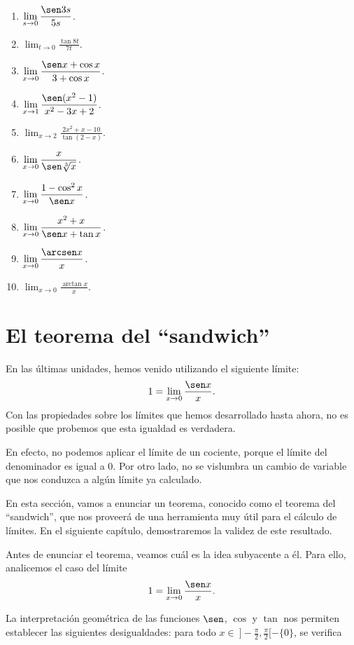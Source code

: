 \begin{multicols}{2}
\begin{enumerate}[leftmargin=*]
\begin{enumerate}[leftmargin=*]
\item $\displaystyle \lim_{s\to 0}\frac{\sen 3s}{5s}$.
\item $\displaystyle \lim_{t\to 0}\frac{\tan 8t}{7t}$.
\item $\displaystyle \lim_{x\to 0}\frac{\sen x+\cos x}{3+\cos x}$.
\item $\displaystyle \lim_{x\to 1}\frac{\sen (x^2-1)}{x^2-3x+2}$.
\item $\displaystyle \lim_{x\to 2}\frac{2x^2+x-10}{\tan (2-x)}$.
\item $\displaystyle \lim_{x\to 0}\frac{x}{\sen\sqrt[3]{x}}$.
\item $\displaystyle \lim_{x\to 0}\frac{1-\cos^2x}{\sen x}$.
\item $\displaystyle \lim_{x\to 0}\frac{x^2+x}{\sen x+\tan x}$.
\item $\displaystyle \lim_{x\to 0}\frac{\arcsen x}{x}$.
\item $\displaystyle \lim_{x\to 0}\frac{\arctan x}{x}$.
\end{enumerate}
\end{enumerate}
\end{multicols}
\endgroup

\section{El teorema del ``sandwich''}
En las últimas unidades, hemos venido utilizando el siguiente límite:
\[
1 = \limjc{\frac{\sen x}{x}}{x}{0}.
\]
Con las propiedades sobre los límites que hemos desarrollado hasta ahora, no es posible que
probemos que esta igualdad es verdadera.

En efecto, no podemos aplicar el límite de un cociente, porque el límite del denominador es igual a
$0$. Por otro lado, no se vislumbra un cambio de variable que nos conduzca a algún límite ya
calculado.

En esta sección, vamos a enunciar un teorema, conocido como el teorema del ``sandwich'', que nos
proveerá de una herramienta muy útil para el cálculo de límites. En el siguiente capítulo,
demostraremos la validez de este resultado.

Antes de enunciar el teorema, veamos cuál es la idea subyacente a él. Para ello, analicemos el caso
del límite
\[
1 = \limjc{\frac{\sen x}{x}}{x}{0}.
\]

La interpretación geométrica de las funciones $\sen$, $\cos$ y $\tan$ nos permiten establecer las
siguientes desigualdades: para todo $x \in \ ]-\frac{\pi}{2},\frac{\pi}{2}[ - \{0\}$, se verifica

